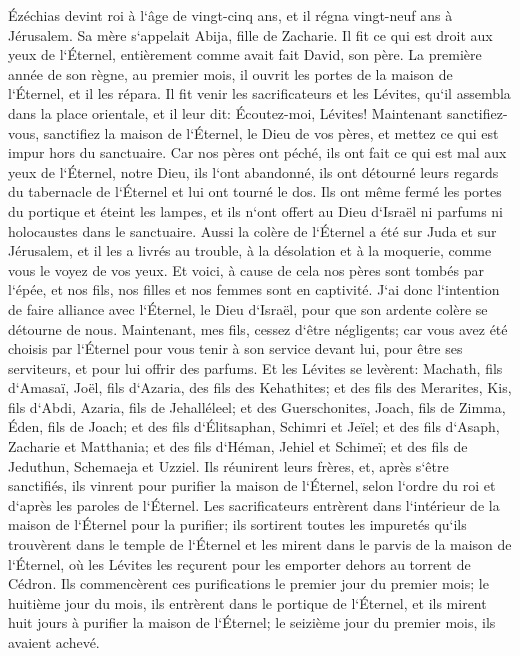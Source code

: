 \verse Ézéchias devint roi à l`âge de vingt-cinq ans, et il régna vingt-neuf ans à Jérusalem. Sa mère s`appelait Abija, fille de Zacharie. 
\verse Il fit ce qui est droit aux yeux de l`Éternel, entièrement comme avait fait David, son père. 
\verse La première année de son règne, au premier mois, il ouvrit les portes de la maison de l`Éternel, et il les répara. 
\verse Il fit venir les sacrificateurs et les Lévites, qu`il assembla dans la place orientale, 
\verse et il leur dit: Écoutez-moi, Lévites! Maintenant sanctifiez-vous, sanctifiez la maison de l`Éternel, le Dieu de vos pères, et mettez ce qui est impur hors du sanctuaire. 
\verse Car nos pères ont péché, ils ont fait ce qui est mal aux yeux de l`Éternel, notre Dieu, ils l`ont abandonné, ils ont détourné leurs regards du tabernacle de l`Éternel et lui ont tourné le dos. 
\verse Ils ont même fermé les portes du portique et éteint les lampes, et ils n`ont offert au Dieu d`Israël ni parfums ni holocaustes dans le sanctuaire. 
\verse Aussi la colère de l`Éternel a été sur Juda et sur Jérusalem, et il les a livrés au trouble, à la désolation et à la moquerie, comme vous le voyez de vos yeux. 
\verse Et voici, à cause de cela nos pères sont tombés par l`épée, et nos fils, nos filles et nos femmes sont en captivité. 
\verse J`ai donc l`intention de faire alliance avec l`Éternel, le Dieu d`Israël, pour que son ardente colère se détourne de nous. 
\verse Maintenant, mes fils, cessez d`être négligents; car vous avez été choisis par l`Éternel pour vous tenir à son service devant lui, pour être ses serviteurs, et pour lui offrir des parfums. 
\verse Et les Lévites se levèrent: Machath, fils d`Amasaï, Joël, fils d`Azaria, des fils des Kehathites; et des fils des Merarites, Kis, fils d`Abdi, Azaria, fils de Jehalléleel; et des Guerschonites, Joach, fils de Zimma, Éden, fils de Joach; 
\verse et des fils d`Élitsaphan, Schimri et Jeïel; et des fils d`Asaph, Zacharie et Matthania; 
\verse et des fils d`Héman, Jehiel et Schimeï; et des fils de Jeduthun, Schemaeja et Uzziel. 
\verse Ils réunirent leurs frères, et, après s`être sanctifiés, ils vinrent pour purifier la maison de l`Éternel, selon l`ordre du roi et d`après les paroles de l`Éternel. 
\verse Les sacrificateurs entrèrent dans l`intérieur de la maison de l`Éternel pour la purifier; ils sortirent toutes les impuretés qu`ils trouvèrent dans le temple de l`Éternel et les mirent dans le parvis de la maison de l`Éternel, où les Lévites les reçurent pour les emporter dehors au torrent de Cédron. 
\verse Ils commencèrent ces purifications le premier jour du premier mois; le huitième jour du mois, ils entrèrent dans le portique de l`Éternel, et ils mirent huit jours à purifier la maison de l`Éternel; le seizième jour du premier mois, ils avaient achevé. 
